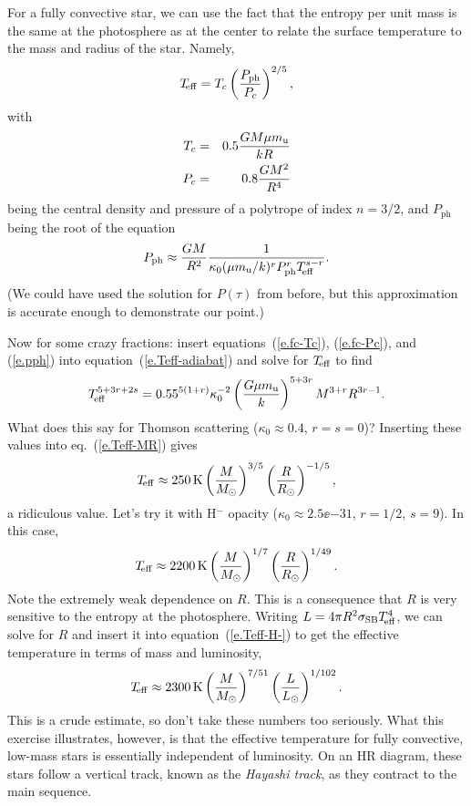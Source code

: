 For a fully convective star, we can use the fact that the entropy per unit mass is the same at the photosphere as at the center to relate the surface temperature to the mass and radius of the star. Namely,
\begin{equation}\label{e.Teff-adiabat}
T_{\!\mathrm{eff}} = T_{c}\left(\frac{P_{\mathrm{ph}}}{P_{c}}\right)^{2/5},
\end{equation}
with
\begin{eqnarray}
T_{c} &=& 0.5 \frac{GM\mu m_\mathrm{u}}{kR} \label{e.fc-Tc}\\
P_{c} &=& 0.8\frac{GM^{2}}{R^{4}} \label{e.fc-Pc}
\end{eqnarray}
being the central density and pressure of a polytrope of index $n=3/2$, and $P_{\mathrm{ph}}$ being the root of the equation
\begin{equation}\label{e.pph}
 P_{\mathrm{ph}} \approx \frac{GM}{R^{2}}\frac{1}{\kappa_{0}(\mu m_\mathrm{u}/k)^{r}P_{\mathrm{ph}}^{r}T_{\!\mathrm{eff}}^{s-r}}. 
\end{equation}
(We could have used the solution for $P(\tau)$ from before, but this approximation is accurate enough to demonstrate our point.)

Now for some crazy fractions: insert equations~(\ref{e.fc-Tc}), (\ref{e.fc-Pc}), and (\ref{e.pph}) into equation~(\ref{e.Teff-adiabat}) and solve for $T_{\!\mathrm{eff}}$ to find
\begin{equation}\label{e.Teff-MR}
T_{\!\mathrm{eff}}^{5+3r+2s} = 0.55^{5(1+r)}\kappa_{0}^{-2} \left(\frac{G\mu m_\mathrm{u}}{k}\right)^{5+3r}M^{3+r} R^{3r-1}.
\end{equation}
What does this say for Thomson scattering ($\kappa_{0} \approx 0.4$, $r=s=0$)? Inserting these values into eq.~(\ref{e.Teff-MR}) gives
\begin{equation}\label{e.Teff-th}
	T_{\!\mathrm{eff}} \approx 250\,\mathrm{K} \left(\frac{M}{M_\odot}\right)^{3/5}\left(\frac{R}{R_{\odot}}\right)^{-1/5},
\end{equation}
a ridiculous value. Let's try it with H$^{-}$ opacity ($\kappa_{0} \approx 2.5\ee{-31}$, $r=1/2$, $s=9$). In this case,
\begin{equation}\label{e.Teff-H-}
 T_{\!\mathrm{eff}} \approx 2200\,\mathrm{K} \left(\frac{M}{M_\odot}\right)^{1/7}\left(\frac{R}{R_{\odot}}\right)^{1/49}.
\end{equation}
Note the extremely weak dependence on $R$.  This is a consequence that $R$ is very sensitive to the entropy at the photosphere.  Writing $L = 4\pi R^{2}\sigma_{\mathrm{SB}} T_{\!\mathrm{eff}}^{4}$, we can solve for $R$ and insert it into equation~(\ref{e.Teff-H-}) to get the effective temperature in terms of mass and luminosity,
\begin{equation}\label{e.Hayashi}
 T_{\!\mathrm{eff}} \approx 2300\,\mathrm{K} \left(\frac{M}{M_\odot}\right)^{7/51}\left(\frac{L}{L_{\odot}}\right)^{1/102}.
\end{equation}
This is a crude estimate, so don't take these numbers too seriously. What this exercise illustrates, however, is that the effective temperature for fully convective, low-mass stars is essentially independent of luminosity.  On an HR diagram, these stars follow a vertical track, known as the \emph{Hayashi track}, as they contract to the main sequence.

